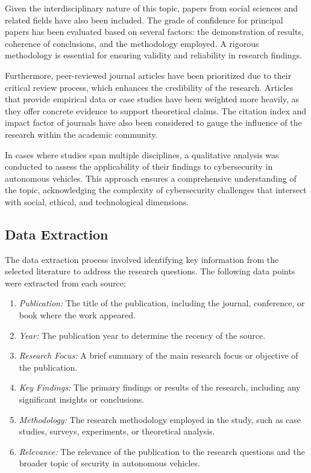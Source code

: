 Given the interdisciplinary nature of this topic, papers from social sciences and related fields have also been included.
The grade of confidence for principal papers has been evaluated based on several factors: the demonstration of results, coherence of conclusions, and the methodology employed.
A rigorous methodology is essential for ensuring validity and reliability in research findings.

Furthermore, peer-reviewed journal articles have been prioritized due to their critical review process, which enhances the credibility of the research.
Articles that provide empirical data or case studies have been weighted more heavily, as they offer concrete evidence to support theoretical claims.
The citation index and impact factor of journals have also been considered to gauge the influence of the research within the academic community.

In cases where studies span multiple disciplines, a qualitative analysis was conducted to assess the applicability of their findings to cybersecurity in autonomous vehicles.
This approach ensures a comprehensive understanding of the topic, acknowledging the complexity of cybersecurity challenges that intersect with social, ethical, and technological dimensions.


\subsection{Data Extraction}\label{subsec:data-extraction}

The data extraction process involved identifying key information from the selected literature to address the research questions.
The following data points were extracted from each source:
\begin{enumerate}
    \item \textit{Publication:} The title of the publication, including the journal, conference, or book where the work appeared.
    \item \textit{Year:} The publication year to determine the recency of the source.
    \item \textit{Research Focus:} A brief summary of the main research focus or objective of the publication.
    \item \textit{Key Findings:} The primary findings or results of the research, including any significant insights or conclusions.
    \item \textit{Methodology:} The research methodology employed in the study, such as case studies, surveys, experiments, or theoretical analysis.
    \item \textit{Relevance:} The relevance of the publication to the research questions and the broader topic of security in autonomous vehicles.
\end{enumerate}


